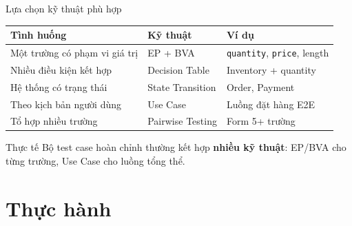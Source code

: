 \documentclass[aspectratio=169,12pt]{beamer}
\begin{document}
\begin{frame}[shrink=10]{Lựa chọn kỹ thuật phù hợp}
  \begin{center}
  \scriptsize
  \setlength{\tabcolsep}{4pt}
  \renewcommand{\arraystretch}{0.9}
  \begin{tabular}{p{3.2cm}p{2.2cm}p{4.7cm}}
    \toprule
    \textbf{Tình huống} & \textbf{Kỹ thuật} & \textbf{Ví dụ} \\
    \midrule
    Một trường có phạm vi giá trị & EP + BVA & \texttt{quantity}, \texttt{price}, length \\
    Nhiều điều kiện kết hợp & Decision Table & Inventory + quantity \\
    Hệ thống có trạng thái & State Transition & Order, Payment \\
    Theo kịch bản người dùng & Use Case & Luồng đặt hàng E2E \\
    Tổ hợp nhiều trường & Pairwise Testing & Form 5+ trường \\
    \bottomrule
  \end{tabular}
  \renewcommand{\arraystretch}{1}
  \end{center}

  \vspace{0.05em}
  \begin{exampleblock}{Thực tế}
    \small Bộ test case hoàn chỉnh thường kết hợp \textbf{nhiều kỹ thuật}: EP/BVA cho từng trường, Use Case cho luồng tổng thể.
  \end{exampleblock}
\end{frame}

\section{Thực hành}
\end{document}

